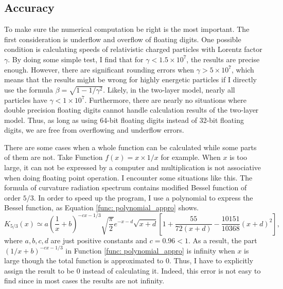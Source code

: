 \documentclass[a4paper, 12pt]{report}
\begin{document}
    \subsection{Accuracy}
      To make sure the numerical computation be right is the most important. 
      The first consideration is underflow and overflow of floating digits.
      One possible condition is calculating speeds of relativistic charged particles with 
      Lorentz factor $\gamma$. By doing some simple test, I find that for 
      $\gamma < 1.5\times 10^7$, the results are precise enough. However, there are 
      significant rounding errors when $\gamma > 5\times 10^7$, which means that the 
      results might be wrong for highly energetic particles if I directly use the formula 
      $\beta = \sqrt{1 - 1/\gamma^2}$.
      Likely, in the two-layer model, nearly all particles have $\gamma < 1\times 10^7$. 
      Furthermore, there are nearly no situations where double precision floating digits
      cannot handle calculation results of the two-layer model. Thus, as long as using 
      64-bit floating digits instead of 32-bit floating digits, we are free from overflowing 
      and underflow errors. 
        
      There are some cases when a whole function can be calculated while some parts of them 
      are not. Take Function $f\left(x\right) = x\times1/x$ for example. When $x$ is too 
      large, it can not be expressed by a computer and multiplication is not associative when 
      doing floating point operation. I encounter some situations like this.
      The formula of curvature radiation spectrum contains modified Bessel function of order 
      $5/3$. In order to speed up the program, I use a polynomial to express the Bessel 
      function, as Equation \ref{func: polynomial_appro} shows. 
      \begin{equation}
        K_{5/3} \left(x\right) \simeq a \left(\frac{1}{x} + b\right)^{-cx - 1/3} \sqrt{\frac{\pi}{2}} e^{-x - d} \sqrt{x + d} %
        \left[1 + \frac{55}{72\left(x + d\right)} - \frac{10151}{10368}\left(x+d\right)^2\right] ,
        \label{func: polynomial_appro}
      \end{equation}
      where $a,b,c,d$ are just positive constants and $c = 0.96 < 1$. As a result, 
      the part $(1/x + b)^{-cx - 1/3}$ in Function \ref{func: polynomial_appro} is infinity
      when $x$ is large though the total function is approximated to $0$. Thus, I have to 
      explicitly assign the result to be $0$ instead of calculating it. Indeed, this error 
      is not easy to find since in most cases the results are not infinity. 
          
\end{document}
